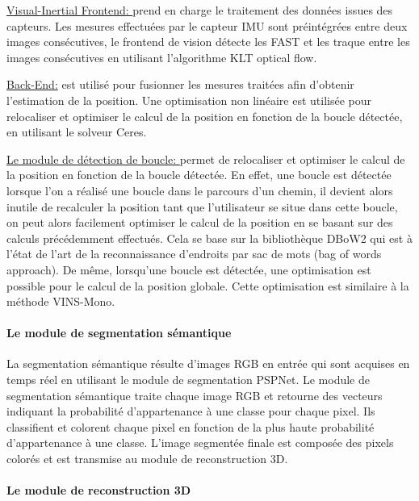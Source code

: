 \documentclass[11pt]{article}
\begin{document}
  \underline{Visual-Inertial Frontend: }
  prend en charge le traitement des données issues des capteurs. Les mesures effectuées par le capteur IMU
  sont préintégrées entre deux images consécutives, le frontend de vision détecte les FAST
  et les traque entre les images consécutives en utilisant l'algorithme KLT optical flow.

  \underline{Back-End:} est utilisé pour fusionner les mesures traitées afin d'obtenir l'estimation de la position. Une optimisation non linéaire
  est utilisée pour relocaliser et optimiser le calcul de la position en fonction de la boucle détectée, en utilisant le solveur Ceres. 

  \underline{Le module de détection de boucle: } permet de relocaliser et optimiser le calcul de la position en fonction de
  la boucle détectée. En effet, une boucle est détectée lorsque l'on a réalisé une boucle dans le parcours d'un chemin, il devient alors inutile
  de recalculer la position tant que l'utilisateur se situe dans cette boucle, on peut alors facilement optimiser le calcul de la position en se 
  basant sur des calculs précédemment effectués. Cela se base sur la bibliothèque DBoW2 qui est à l'état de l'art de la reconnaissance d'endroits 
  par sac de mots (bag of words approach). De même, lorsqu'une boucle est détectée, une optimisation est possible pour le calcul de la position 
  globale. Cette optimisation est similaire à la méthode VINS-Mono.

  \paragraph{Le module de segmentation sémantique}
  La segmentation sémantique résulte d'images RGB en entrée qui sont acquises en temps réel en utilisant le module de segmentation PSPNet. 
  Le module de segmentation sémantique traite chaque image RGB et retourne des vecteurs indiquant la probabilité d'appartenance à une classe
  pour chaque pixel. Ils classifient et colorent chaque pixel en fonction de la plus haute probabilité d'appartenance à une classe. 
  L'image segmentée finale est composée des pixels colorés et est transmise au module de reconstruction 3D.

  \paragraph{Le module de reconstruction 3D}
\end{document}
